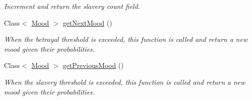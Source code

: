 \begin{DoxyCompactItemize}
\begin{DoxyCompactList}\small\item\em Increment and return the slavery count field. \end{DoxyCompactList}\item 
Class$<$ \hyperlink{a00015}{Mood} $>$ \hyperlink{a00015_aa0080ad0116bb5b614bbbc56d448ad22}{get\-Next\-Mood} ()
\begin{DoxyCompactList}\small\item\em When the betrayal threshold is exceeded, this function is called and return a new mood given their probabilities. \end{DoxyCompactList}\item 
Class$<$ \hyperlink{a00015}{Mood} $>$ \hyperlink{a00015_aceaadc827da68781c215cf280a8062f8}{get\-Previous\-Mood} ()
\begin{DoxyCompactList}\small\item\em When the slavery threshold is exceeded, this function is called and return a new mood given their probabilities. \end{DoxyCompactList}\end{DoxyCompactItemize}
